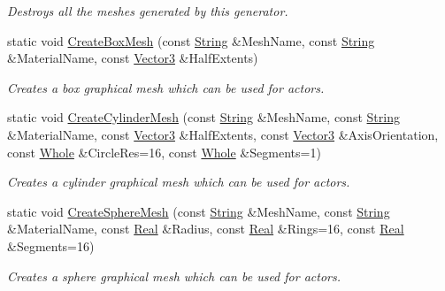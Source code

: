 \begin{DoxyCompactItemize}
\begin{DoxyCompactList}\small\item\em Destroys all the meshes generated by this generator. \item\end{DoxyCompactList}\item 
static void \hyperlink{classphys_1_1MeshGenerator_a1710315174186367ce566125feb3df6d}{CreateBoxMesh} (const \hyperlink{namespacephys_aa03900411993de7fbfec4789bc1d392e}{String} \&MeshName, const \hyperlink{namespacephys_aa03900411993de7fbfec4789bc1d392e}{String} \&MaterialName, const \hyperlink{classphys_1_1Vector3}{Vector3} \&HalfExtents)
\begin{DoxyCompactList}\small\item\em Creates a box graphical mesh which can be used for actors. \item\end{DoxyCompactList}\item 
static void \hyperlink{classphys_1_1MeshGenerator_a7d7372e91e3d039c656f78be3cb5b951}{CreateCylinderMesh} (const \hyperlink{namespacephys_aa03900411993de7fbfec4789bc1d392e}{String} \&MeshName, const \hyperlink{namespacephys_aa03900411993de7fbfec4789bc1d392e}{String} \&MaterialName, const \hyperlink{classphys_1_1Vector3}{Vector3} \&HalfExtents, const \hyperlink{classphys_1_1Vector3}{Vector3} \&AxisOrientation, const \hyperlink{namespacephys_a460f6bc24c8dd347b05e0366ae34f34a}{Whole} \&CircleRes=16, const \hyperlink{namespacephys_a460f6bc24c8dd347b05e0366ae34f34a}{Whole} \&Segments=1)
\begin{DoxyCompactList}\small\item\em Creates a cylinder graphical mesh which can be used for actors. \item\end{DoxyCompactList}\item 
static void \hyperlink{classphys_1_1MeshGenerator_a2d1dfdfe8fae04773de67118a4513f5d}{CreateSphereMesh} (const \hyperlink{namespacephys_aa03900411993de7fbfec4789bc1d392e}{String} \&MeshName, const \hyperlink{namespacephys_aa03900411993de7fbfec4789bc1d392e}{String} \&MaterialName, const \hyperlink{namespacephys_af7eb897198d265b8e868f45240230d5f}{Real} \&Radius, const \hyperlink{namespacephys_af7eb897198d265b8e868f45240230d5f}{Real} \&Rings=16, const \hyperlink{namespacephys_af7eb897198d265b8e868f45240230d5f}{Real} \&Segments=16)
\begin{DoxyCompactList}\small\item\em Creates a sphere graphical mesh which can be used for actors. \item\end{DoxyCompactList}\end{DoxyCompactItemize}
